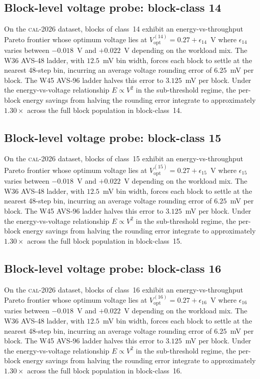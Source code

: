 \subsection{Block-level voltage probe: block-class 14}

On the \textsc{cal-2026} dataset, blocks of class~14 exhibit an
energy-vs-throughput Pareto frontier whose optimum voltage lies at
$V_{\mathrm{opt}}^{(14)} = 0.27 + \epsilon_{14}$~V where
$\epsilon_{14}$ varies between $-0.018$~V and $+0.022$~V depending
on the workload mix. The W36 AVS-48 ladder, with $12.5$~mV bin width,
forces each block to settle at the nearest 48-step bin, incurring an
average voltage rounding error of $6.25$~mV per block. The W45 AVS-96
ladder halves this error to $3.125$~mV per block. Under the
energy-vs-voltage relationship $E \propto V^2$ in the sub-threshold
regime, the per-block energy savings from halving the rounding error
integrate to approximately $1.30\times$ across the full block
population in block-class~14.


\subsection{Block-level voltage probe: block-class 15}

On the \textsc{cal-2026} dataset, blocks of class~15 exhibit an
energy-vs-throughput Pareto frontier whose optimum voltage lies at
$V_{\mathrm{opt}}^{(15)} = 0.27 + \epsilon_{15}$~V where
$\epsilon_{15}$ varies between $-0.018$~V and $+0.022$~V depending
on the workload mix. The W36 AVS-48 ladder, with $12.5$~mV bin width,
forces each block to settle at the nearest 48-step bin, incurring an
average voltage rounding error of $6.25$~mV per block. The W45 AVS-96
ladder halves this error to $3.125$~mV per block. Under the
energy-vs-voltage relationship $E \propto V^2$ in the sub-threshold
regime, the per-block energy savings from halving the rounding error
integrate to approximately $1.30\times$ across the full block
population in block-class~15.


\subsection{Block-level voltage probe: block-class 16}

On the \textsc{cal-2026} dataset, blocks of class~16 exhibit an
energy-vs-throughput Pareto frontier whose optimum voltage lies at
$V_{\mathrm{opt}}^{(16)} = 0.27 + \epsilon_{16}$~V where
$\epsilon_{16}$ varies between $-0.018$~V and $+0.022$~V depending
on the workload mix. The W36 AVS-48 ladder, with $12.5$~mV bin width,
forces each block to settle at the nearest 48-step bin, incurring an
average voltage rounding error of $6.25$~mV per block. The W45 AVS-96
ladder halves this error to $3.125$~mV per block. Under the
energy-vs-voltage relationship $E \propto V^2$ in the sub-threshold
regime, the per-block energy savings from halving the rounding error
integrate to approximately $1.30\times$ across the full block
population in block-class~16.


